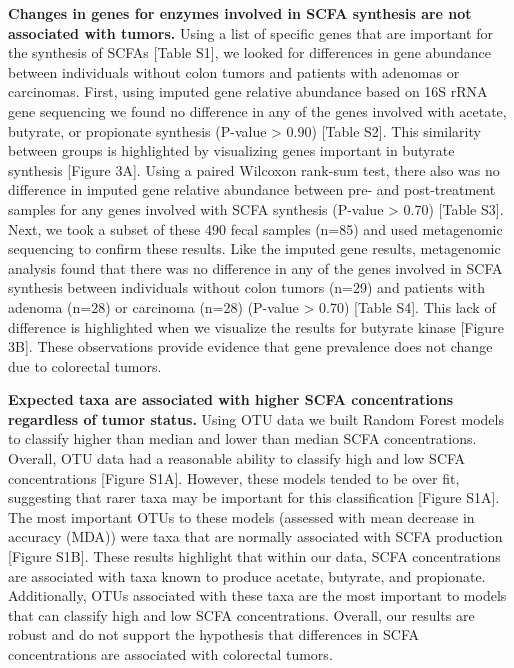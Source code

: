 \documentclass[11pt,]{article}
\begin{document}
\textbf{Changes in genes for enzymes involved in SCFA synthesis are not
associated with tumors.} Using a list of specific genes that are
important for the synthesis of SCFAs {[}Table S1{]}, we looked for
differences in gene abundance between individuals without colon tumors
and patients with adenomas or carcinomas. First, using imputed gene
relative abundance based on 16S rRNA gene sequencing we found no
difference in any of the genes involved with acetate, butyrate, or
propionate synthesis (P-value \textgreater{} 0.90) {[}Table S2{]}. This
similarity between groups is highlighted by visualizing genes important
in butyrate synthesis {[}Figure 3A{]}. Using a paired Wilcoxon rank-sum
test, there also was no difference in imputed gene relative abundance
between pre- and post-treatment samples for any genes involved with SCFA
synthesis (P-value \textgreater{} 0.70) {[}Table S3{]}. Next, we took a
subset of these 490 fecal samples (n=85) and used metagenomic sequencing
to confirm these results. Like the imputed gene results, metagenomic
analysis found that there was no difference in any of the genes involved
in SCFA synthesis between individuals without colon tumors (n=29) and
patients with adenoma (n=28) or carcinoma (n=28) (P-value \textgreater{}
0.70) {[}Table S4{]}. This lack of difference is highlighted when we
visualize the results for butyrate kinase {[}Figure 3B{]}. These
observations provide evidence that gene prevalence does not change due
to colorectal tumors.

\textbf{Expected taxa are associated with higher SCFA concentrations
regardless of tumor status.} Using OTU data we built Random Forest
models to classify higher than median and lower than median SCFA
concentrations. Overall, OTU data had a reasonable ability to classify
high and low SCFA concentrations {[}Figure S1A{]}. However, these models
tended to be over fit, suggesting that rarer taxa may be important for
this classification {[}Figure S1A{]}. The most important OTUs to these
models (assessed with mean decrease in accuracy (MDA)) were taxa that
are normally associated with SCFA production {[}Figure S1B{]}. These
results highlight that within our data, SCFA concentrations are
associated with taxa known to produce acetate, butyrate, and propionate.
Additionally, OTUs associated with these taxa are the most important to
models that can classify high and low SCFA concentrations. Overall, our
results are robust and do not support the hypothesis that differences in
SCFA concentrations are associated with colorectal tumors.
\end{document}
